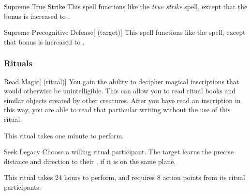 \lowercase{\hypertarget{spell:Supreme True Strike}{}}\label{spell:Supreme True Strike}
\begin{apability}[\nth{5}]{\hypertarget{spell:Supreme True Strike}{Supreme True Strike}}
This spell functions like the \textit{true strike} spell, except that the bonus is increased to .
\end{apability}
\vspace{0.25em}



\lowercase{\hypertarget{spell:Supreme Precognitive Defense}{}}\label{spell:Supreme Precognitive Defense}
\begin{attuneability}[\nth{7}]{\hypertarget{spell:Supreme Precognitive Defense}{Supreme Precognitive Defense}}[ (target)]
This spell functions like the  spell, except that bonus is increased to .
\end{attuneability}
\vspace{0.25em}



\subsubsection{Rituals}


\lowercase{\hypertarget{spell:Read Magic}{}}\label{spell:Read Magic}
\begin{attuneability}[\nth{1}]{\hypertarget{spell:Read Magic}{Read Magic}}[ (ritual)]
You gain the ability to decipher magical inscriptions that would otherwise be unintelligible.
This can allow you to read ritual books and similar objects created by other creatures.
After you have read an inscription in this way, you are able to read that particular writing without the use of this ritual.

This ritual takes one minute to perform.
\end{attuneability}
\vspace{0.25em}



\lowercase{\hypertarget{spell:Seek Legacy}{}}\label{spell:Seek Legacy}
\begin{apability}[\nth{2}]{\hypertarget{spell:Seek Legacy}{Seek Legacy}}
Choose a willing ritual participant.
The target learns the precise distance and direction to their , if it is on the same plane.

This ritual takes 24 hours to perform, and requires 8 action points from its ritual participants.
\end{apability}
\vspace{0.25em}



